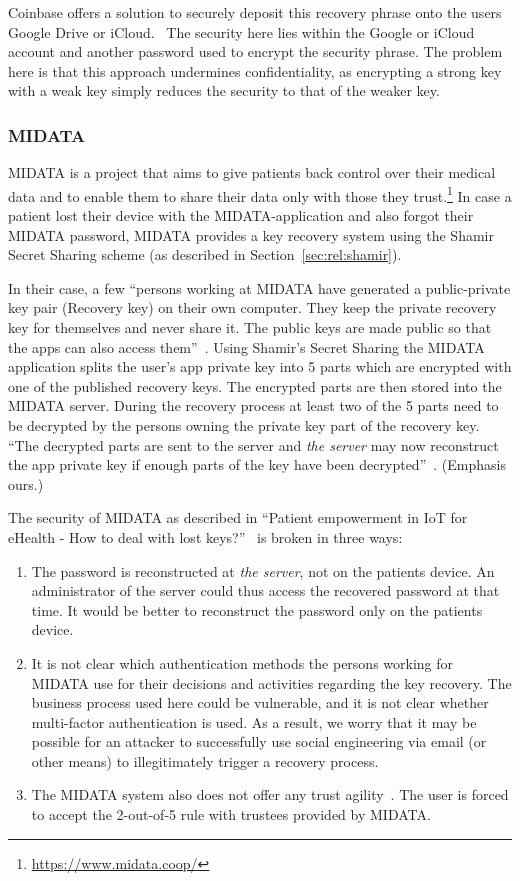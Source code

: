 Coinbase offers a solution to securely deposit this recovery phrase
onto the users Google Drive or iCloud.~\cite{coinbase} The security
here lies within the Google or iCloud account and another password
used to encrypt the security phrase. The problem here is that this
approach undermines confidentiality, as encrypting a strong key with a
weak key simply reduces the security to that of the weaker key.

\subsubsection{MIDATA}

MIDATA is a project that aims to give patients back control over their
medical data and to enable them to share their data only with those
they trust.\footnote{\url{https://www.midata.coop/}} In case a patient
lost their device with the MIDATA-application and also forgot their
MIDATA password, MIDATA provides a key recovery system using the
Shamir Secret Sharing scheme (as described in
Section~\ref{sec:rel:shamir}).

In their case, a few ``persons working at MIDATA have generated a
public-private key pair (Recovery key) on their own computer. They
keep the private recovery key for themselves and never share it. The
public keys are made public so that the apps can also access
them''~\cite{midata}. Using Shamir's Secret Sharing the MIDATA
application splits the user's app private key into 5 parts which are
encrypted with one of the published recovery keys. The encrypted parts
are then stored into the MIDATA server. During the recovery process at
least two of the 5 parts need to be decrypted by the persons owning
the private key part of the recovery key. ``The decrypted parts are
sent to the server and {\em the server} may now reconstruct the app
private key if enough parts of the key have been
decrypted''~\cite{midata}. (Emphasis ours.)

The security of MIDATA as described in ``Patient empowerment in IoT
for eHealth - How to deal with lost keys?''~\cite{midata} is broken in
three ways:

\begin{enumerate}
 \item The password is reconstructed at {\em the server}, not on the
   patients device. An administrator of the server could thus
   access the recovered password at that time.  It would be better
   to reconstruct the password only on the patients device.
 \item It is not clear which authentication methods the persons
   working for MIDATA use for their decisions and activities regarding
   the key recovery. The business process used here could be
   vulnerable, and it is not clear whether multi-factor authentication
   is used. As a result, we worry that it may be possible for an attacker
   to successfully use social engineering via email (or other means)
   to illegitimately trigger a recovery process.
 \item The MIDATA system also does not offer any trust agility~\cite{marlinspike2011}.
   The user is forced to accept the 2-out-of-5 rule with trustees
   provided by MIDATA.
\end{enumerate}
